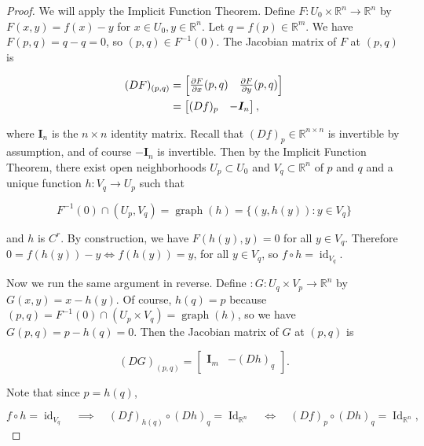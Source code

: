 \begin{proof}

We will apply the Implicit Function Theorem. Define \(F: U_0 \times \mathbb{R}^n \to \mathbb{R}^n\) by \(F(x,y) = f(x) - y\) for \(x \in U_0, y \in \mathbb{R}^n\). Let \(q = f(p) \in \mathbb{R}^m\). We have \(F(p,q) = q -q = 0\), so \((p,q) \in F^{-1}(0)\). The Jacobian matrix of \(F\) at \((p,q)\) is  

\begin{align*}
(DF)_{(p,q)} & = \begin{bmatrix} \pderiv{F}{x}(p,q) & \pderiv{F}{y}(p,q) \end{bmatrix}
\\  & = \begin{bmatrix}  (Df)_p & - \boldsymbol{I}_n \end{bmatrix},
\end{align*}

where \(\boldsymbol{I}_n \) is the \(n \times n\) identity matrix. Recall that \((Df)_p \in \mathbb{R}^{n \times n}\) is invertible by assumption, and of course \(-\boldsymbol{I}_n \) is invertible. Then by the Implicit Function Theorem, there exist open neighborhoods \(U_p \subset U_0\) and \(V_q \subset \mathbb{R}^n\) of \(p\) and \(q\) and a unique function \(h: V_q \to U_p\) such that 

\[
F^{-1}(0) \cap (U_p, V_q) = \operatorname{graph}(h) = \{(y, h(y)): y \in V_q\} 
\]

and \(h\) is \(C^r\). By construction, we have \(F(h(y), y) = 0\) for all \(y \in V_q\). Therefore \(0 = f(h(y)) - y \iff f(h(y)) = y\), for all \(y \in V_q\), so \(f \circ h = \operatorname{id}_{V_q}\).

Now we run the same argument in reverse. Define \(:G: U_q \times V_p \to \mathbb{R}^n\) by \(G(x,y) = x - h(y)\). Of course, \(h(q) = p\) because \((p,q) = F^{-1}(0) \cap (U_p \times V_q) = \operatorname{graph}(h)\), so we have \(G(p,q) = p - h(q) = 0\). Then the Jacobian matrix of \(G\) at \((p,q)\) is

\[
(DG)_{(p,q)} = \begin{bmatrix} \boldsymbol{I}_m & -(Dh)_q \end{bmatrix}.
\]

Note that since \(p = h(q)\),

\[
f \circ h = \operatorname{id}_{V_q} \quad \implies \quad (Df)_{h(q)} \circ (Dh)_q = \operatorname{Id}_{\mathbb{R}^n} \quad \iff \quad (Df)_{p} \circ (Dh)_q = \operatorname{Id}_{\mathbb{R}^n},
\]


\end{proof}
